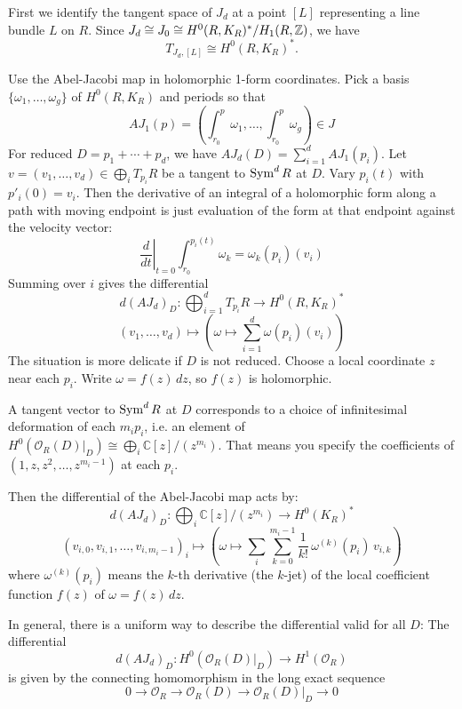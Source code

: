 \documentclass[12pt]{article}
\begin{document}
\begin{remark}
     First we identify the tangent space of $J_d$ at a point $[L]$ representing a line bundle $L$ on $R$. Since $J_d \cong J_0 \cong H^0(R,K_R)^*/H_1(R,\mathbb{Z})$, we have
\[T_{J_d,[L]} \cong H^0(R,K_R)^*.
\]
    
    Use the Abel-Jacobi map in holomorphic 1-form coordinates. Pick a basis $\{\omega_1,\dots,\omega_g\}$ of $H^0(R,K_R)$ and periods so that
    \[
    AJ_1(p)=\left(\int_{r_0}^p \omega_1,\dots,\int_{r_0}^p \omega_g\right)\in J
    \]
    For reduced $D=p_1+\cdots+p_d$, we have $AJ_d(D)=\sum_{i=1}^d AJ_1(p_i)$. Let $v=(v_1,\dots,v_d)\in \bigoplus_i T_{p_i}R$ be a tangent to $\operatorname{Sym}^dR$ at $D$. Vary $p_i(t)$ with $ p'_i(0)=v_i$. Then the derivative of an integral of a holomorphic form along a path with moving endpoint is just evaluation of the form at that endpoint against the velocity vector:
    \[
    \left.\frac{d}{dt}\right|_{t=0}\int_{r_0}^{p_i(t)}\omega_k=\omega_k(p_i)(v_i)
    \]
    Summing over $i$ gives the differential
    \[
    d(AJ_d)_D: \bigoplus_{i=1}^d T_{p_i}R \longrightarrow H^0(R,K_R)^*
    \]
    \[
    (v_1,\dots,v_d) \longmapsto \left(\omega \mapsto \sum_{i=1}^d \omega(p_i)(v_i)\right)
    \]
    The situation is more delicate if $D$ is not reduced. Choose a local coordinate $z$ near each $p_i$.
    Write $\omega = f(z)\,dz$, so $f(z)$ is holomorphic.

    A tangent vector to $\operatorname{Sym}^d R$ at $D$ corresponds to a choice of infinitesimal deformation of each $m_i p_i$, i.e. an element of $H^0(\mathcal O_R(D)|_D) \cong \bigoplus_i \mathbb C[z]/(z^{m_i})$. That means you specify the coefficients of $(1, z, z^2, \ldots, z^{m_i-1})$ at each $p_i$.

    Then the differential of the Abel-Jacobi map acts by:
    \[
    d(AJ_d)_D: \bigoplus_i \mathbb C[z]/(z^{m_i}) \longrightarrow H^0(K_R)^*
    \]
    \[
    (v_{i,0}, v_{i,1}, \ldots, v_{i,m_i-1})_i \mapsto \left(\omega \mapsto \sum_i \sum_{k=0}^{m_i-1} \frac{1}{k!}\, \omega^{(k)}(p_i)\, v_{i,k}\right)
    \]
    where $\omega^{(k)}(p_i)$ means the $k$-th derivative (the $k$-jet) of the local coefficient function $f(z)$ of $\omega=f(z)\,dz$.
    
    In general, there is a uniform way to describe the differential valid for all $D$:
The differential \[d(AJ_d)_D : H^0(\mathcal O_R(D)|_D) \to H^1(\mathcal O_R)\] is given by the connecting homomorphism in the long exact sequence \[0 \to \mathcal O_R \to \mathcal O_R(D) \to \mathcal O_R(D)|_D \to 0\]
\end{remark}
\end{document}
